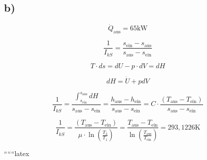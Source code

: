 

\subsection*{b)}

\[
\dot{Q}_{\text{aus}} = 65 \text{kW}
\]

\[
\frac{1}{I_{kS}} = \frac{s_{\text{ein}} - s_{\text{aus}}}{s_{\text{aus}} - s_{\text{ein}}}
\]

\[
T \cdot ds = dU - p \cdot dV = dH
\]

\[
dH = \dot{U} + p dV
\]

\[
\frac{1}{I_{kS}} = \frac{\int_{s_{\text{ein}}}^{s_{\text{aus}}} dH}{s_{\text{aus}} - s_{\text{ein}}} = \frac{h_{\text{aus}} - h_{\text{ein}}}{s_{\text{aus}} - s_{\text{ein}}} = C \cdot \frac{(T_{\text{aus}} - T_{\text{ein}})}{s_{\text{aus}} - s_{\text{ein}}}
\]

\[
\frac{1}{I_{kS}} = \frac{(T_{\text{aus}} - T_{\text{ein}})}{\mu \cdot \ln \left( \frac{T_2}{T_1} \right)} = \frac{T_{\text{aus}} - T_{\text{ein}}}{\ln \left( \frac{T_{\text{aus}}}{T_{\text{ein}}} \right)} = 293,1226 \text{K}
\]

``````latex